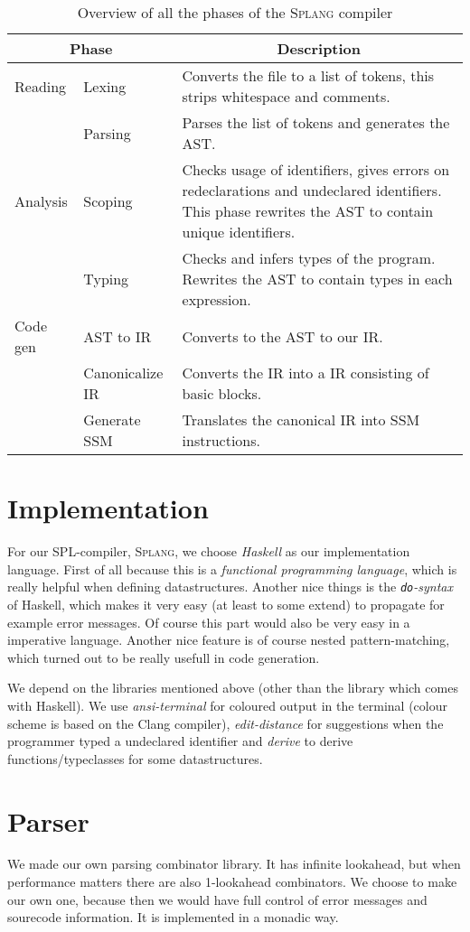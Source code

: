 \documentclass[14pt]{amsart}
\newcommand{\splang}{\textsc{Splang}\xspace}
\begin{document}
\begin{table}
\begin{tabular}{l l p{8cm}}
\multicolumn{2}{c}{Phase} & \multicolumn{1}{c}{Description}\\
\hline Reading
 & Lexing & Converts the file to a list of tokens, this strips whitespace and comments. \\
 & Parsing & Parses the list of tokens and generates the AST. \\
\hline Analysis
 & Scoping & Checks usage of identifiers, gives errors on redeclarations and undeclared identifiers. This phase rewrites the AST to contain unique identifiers. \\
 & Typing & Checks and infers types of the program. Rewrites the AST to contain types in each expression. \\
\hline Code gen
 & AST to IR & Converts to the AST to our IR. \\
 & Canonicalize IR & Converts the IR into a IR consisting of basic blocks. \\
 & Generate SSM & Translates the canonical IR into SSM instructions.
\end{tabular}
\caption{Overview of all the phases of the \splang compiler}
\label{tab:overview}
\end{table}


\section{Implementation}
For our SPL-compiler, \splang, we choose \emph{Haskell} as our implementation language. First of all because this is a \emph{functional programming language}, which is really helpful when defining datastructures. Another nice things is the \emph{\texttt{do}-syntax} of Haskell, which makes it very easy (at least to some extend) to propagate for example error messages. Of course this part would also be very easy in a imperative language. Another nice feature is of course nested pattern-matching, which turned out to be really usefull in code generation.

We depend on the libraries mentioned above (other than the library which comes with Haskell). We use \emph{ansi-terminal} for coloured output in the terminal (colour scheme is based on the {\sc Clang} compiler), \emph{edit-distance} for suggestions when the programmer typed a undeclared identifier and \emph{derive} to derive functions/typeclasses for some datastructures.

\section{Parser}
We made our own parsing combinator library. It has infinite lookahead, but when performance matters there are also 1-lookahead combinators. We choose to make our own one, because then we would have full control of error messages and sourecode information. It is implemented in a monadic way.
\end{document}
